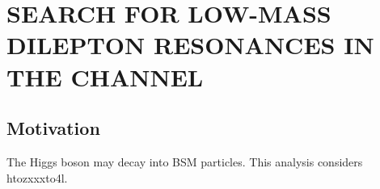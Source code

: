 \chapter{SEARCH FOR LOW-MASS DILEPTON RESONANCES IN THE \texorpdfstring{\hzxxxfourl}{H to ZX/XX to 4l} CHANNEL}
\label{ch:dilep_res}

\section{Motivation}
The Higgs boson may decay into BSM particles.
This analysis considers htozxxxto4l.